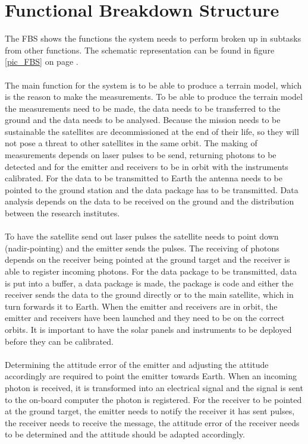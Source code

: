 \section{Functional Breakdown Structure}
\label{section_FBS}
The \ac{FBS} shows the functions the system needs to perform broken up in subtasks from other functions. The schematic representation can be found in figure \ref{pic_FBS} on page \pageref{pic_FBS}.
\\ \\
The main function for the system is to be able to produce a terrain model, which is the reason to make the measurements. To be able to produce the terrain model the measurements need to be made, the data needs to be transferred to the ground and the data needs to be analysed. Because the mission needs to be sustainable the satellites are decommissioned at the end of their life, so they will not pose a threat to other satellites in the same orbit.
The making of measurements depends on laser pulses to be send, returning photons to be detected and for the emitter and receivers to be in orbit with the instruments calibrated. For the data to be transmitted to Earth the antenna needs to be pointed to the ground station and the data package has to be transmitted. Data analysis depends on the data to be received on the ground and the distribution between the research institutes.
\\ \\
To have the satellite send out laser pulses the satellite needs to point down (nadir-pointing) and the emitter sends the pulses. The receiving of photons depends on the receiver being pointed at the ground target and the receiver is able to register incoming photons. For the data package to be transmitted, data is put into a buffer, a data package is made, the package is code and either the receiver sends the data to the ground directly or to the main satellite, which in turn forwards it to Earth. When the emitter and receivers are in orbit, the emitter and receivers have been launched and they need to be on the correct orbits. It is important to have the solar panels and instruments to be deployed before they can be calibrated.
\\ \\
Determining the attitude error of the emitter and adjusting the attitude accordingly are required to point the emitter towards Earth. When an incoming photon is received, it is transformed into an electrical signal and the signal is sent to the on-board computer the photon is registered. For the receiver to be pointed at the ground target, the emitter needs to notify the receiver it has sent pulses, the receiver needs to receive the message, the attitude error of the receiver needs to be determined and the attitude should be adapted accordingly. 

